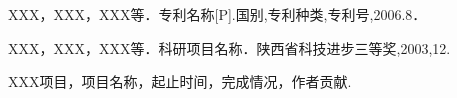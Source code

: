 \begin{enumerate}[{[}1{]}] \wuhao
\item XXX，XXX，XXX等．专利名称[P].国别,专利种类,专利号,2006.8．
\item XXX，XXX，XXX等．科研项目名称．陕西省科技进步三等奖,2003,12.
\item XXX项目，项目名称，起止时间，完成情况，作者贡献.
\end{enumerate}








 
 
